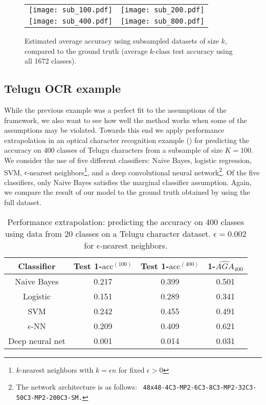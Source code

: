 \documentclass[12pt]{article}
\begin{document}
\begin{figure}
\centering
\begin{tabular}{cc}
\texttt{[image: sub\_100.pdf]} &
\texttt{[image: sub\_200.pdf]} \\
\texttt{[image: sub\_400.pdf]} &
\texttt{[image: sub\_800.pdf]} 
\end{tabular}
\caption{Estimated average accuracy using subsampled datasets of size
  $k$, compared to the ground truth (average $k$-class test accuracy
  using all 1672 classes).}
\label{fig:lfw_extrapolation2}
\end{figure}

\subsection{Telugu OCR example}

While the previous example was a perfect fit to the assumptions of the
framework, we also want to see how well the method works when some of
the assumptions may be violated.  Towards this end we apply performance
extrapolation in an optical character recognition example
(\cite{achanta2015telugu}) for predicting the accuracy on 400 classes
of Telugu characters from a subsample of size $K = 100$.  We consider
the use of five different classifiers: Naive Bayes, logistic
regression, SVM, $\epsilon$-nearest neighbors\footnote{$k$-nearest
  neighbors with $k = \epsilon n$ for fixed $\epsilon > 0$}, and a
deep convolutional neural network\footnote{The network architecture is
  as follows: {\tt
    48x48-4C3-MP2-6C3-8C3-MP2-32C3-50C3-MP2-200C3-SM.}}.  Of the five
classifiers, only Naive Bayes satisfies the marginal classifier
assumption.  Again, we compare the result of our model to the ground
truth obtained by using the full dataset.


\begin{table}
\centering
\begin{tabular}{|c||c|c|c|}\hline
Classifier      & Test 1-$\text{acc}^{(100)}$ & Test 1-$\text{acc}^{(400)}$ & 1-$\hat{AGA}_{400}$ \\ \hline
Naive Bayes     & 0.217                   & 0.399                   & 0.501     \\ \hline
Logistic        & 0.151                   & 0.289                   & 0.341     \\ \hline
SVM             & 0.242                   & 0.455                   & 0.491     \\ \hline
$\epsilon$-NN   & 0.209                   & 0.409                   & 0.621     \\ \hline
Deep neural net & 0.001                   & 0.014                   & 0.031     \\ \hline
\end{tabular}
\caption{Performance extrapolation: predicting the accuracy on 400 classes using data from 20 classes on a Telugu character dataset.
$\epsilon = 0.002$ for $\epsilon$-nearest neighbors.}
\label{tab:telugu}
\end{table}
\end{document}
